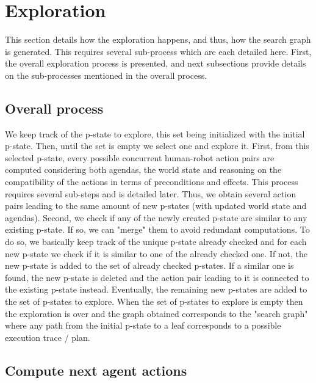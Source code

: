 \section{Exploration}

This section details how the exploration happens, and thus, how the search graph is generated. This requires several sub-process which are each detailed here. First, the overall exploration process is presented, and next subsections provide details on the sub-processes mentioned in the overall process.

    \subsection{Overall process}

We keep track of the p-state to explore, this set being initialized with the initial p-state. Then, until the set is empty we select one and explore it.
First, from this selected p-state, every possible concurrent human-robot action pairs are computed considering both agendas, the world state and reasoning on the compatibility of the actions in terms of preconditions and effects. This process requires several sub-steps and is detailed later. Thus, we obtain several action pairs leading to the same amount of new p-states (with updated world state and agendas).
Second, we check if any of the newly created p-state are similar to any existing p-state. If so, we can "merge" them to avoid redundant computations. To do so, we basically keep track of the unique p-state already checked and for each new p-state we check if it is similar to one of the already checked one. 
If not, the new p-state is added to the set of already checked p-states. 
If a similar one is found, the new p-state is deleted and the action pair leading to it is connected to the existing p-state instead.
Eventually, the remaining new p-states are added to the set of p-states to explore. 
When the set of p-states to explore is empty then the exploration is over and the graph obtained corresponds to the "search graph" where any path from the initial p-state to a leaf corresponds to a possible execution trace / plan.

    \subsection{Compute next agent actions}

